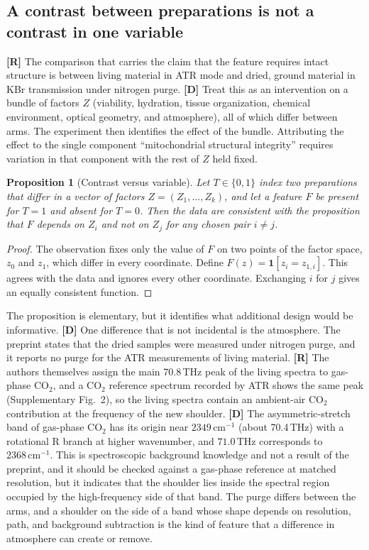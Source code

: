 \documentclass[11pt]{article}
\newcommand{\stR}{\textbf{\textcolor{blue!55!black}{[R]}}}
\newcommand{\stD}{\textbf{\textcolor{green!40!black}{[D]}}}
\newcommand{\thz}{\,\mathrm{THz}}
\newcommand{\cmi}{\,\mathrm{cm^{-1}}}
\theoremstyle{plain}
\newtheorem{proposition}{Proposition}
\theoremstyle{definition}
\theoremstyle{remark}
\begin{document}
\subsection{A contrast between preparations is not a contrast in one variable}

\stR{} The comparison that carries the claim that the feature requires intact structure is between living material in ATR mode and dried, ground material in KBr transmission under nitrogen purge. \stD{} Treat this as an intervention on a bundle of factors $Z$ (viability, hydration, tissue organization, chemical environment, optical geometry, and atmosphere), all of which differ between arms. The experiment then identifies the effect of the bundle. Attributing the effect to the single component ``mitochondrial structural integrity'' requires variation in that component with the rest of $Z$ held fixed.

\begin{proposition}[Contrast versus variable]
\label{prop:contrast}
Let $T\in\{0,1\}$ index two preparations that differ in a vector of factors $Z=(Z_1,\dots,Z_k)$, and let a feature $F$ be present for $T=1$ and absent for $T=0$. Then the data are consistent with the proposition that $F$ depends on $Z_i$ and not on $Z_j$ for any chosen pair $i\ne j$.
\end{proposition}

\begin{proof}
The observation fixes only the value of $F$ on two points of the factor space, $z_0$ and $z_1$, which differ in every coordinate. Define $F(z)=\mathbf 1[z_i=z_{1,i}]$. This agrees with the data and ignores every other coordinate. Exchanging $i$ for $j$ gives an equally consistent function.
\end{proof}

The proposition is elementary, but it identifies what additional design would be informative. \stD{} One difference that is not incidental is the atmosphere. The preprint states that the dried samples were measured under nitrogen purge, and it reports no purge for the ATR measurements of living material. \stR{} The authors themselves assign the main 70.8\,THz peak of the living spectra to gas-phase CO$_2$, and a CO$_2$ reference spectrum recorded by ATR shows the same peak (Supplementary Fig.~2), so the living spectra contain an ambient-air CO$_2$ contribution at the frequency of the new shoulder. \stD{} The asymmetric-stretch band of gas-phase CO$_2$ has its origin near $2349\cmi$ (about 70.4\,THz) with a rotational R branch at higher wavenumber, and $71.0\thz$ corresponds to $2368\cmi$. This is spectroscopic background knowledge and not a result of the preprint, and it should be checked against a gas-phase reference at matched resolution, but it indicates that the shoulder lies inside the spectral region occupied by the high-frequency side of that band. The purge differs between the arms, and a shoulder on the side of a band whose shape depends on resolution, path, and background subtraction is the kind of feature that a difference in atmosphere can create or remove.
\end{document}
